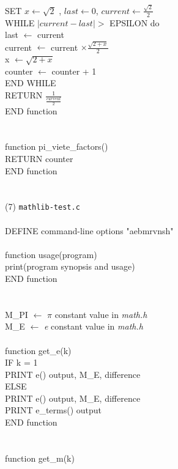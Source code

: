 \documentclass[12pt]{article}
\begin{document}
\indent SET $x \leftarrow \sqrt{2}$ , $last \leftarrow 0$, $current \leftarrow \frac{\sqrt{2}}{2}$ \\
\indent WHILE $| current - last | >$ EPSILON do \\
\indent \indent last $\leftarrow$ current \\
\indent \indent current $\leftarrow$ current $\times \frac{\sqrt{2 + x}}{2}$ \\
\indent \indent x $\leftarrow \sqrt{2 + x}$ \\
\indent \indent counter $\leftarrow$ counter + 1 \\
\indent END WHILE \\
\indent RETURN $\frac{1}{\frac{current}{2}}$ \\
END function \\
\\
\\
function pi\_viete\_factors() \\
\indent RETURN counter \\
END function \\
\\
\\
(7) \texttt{mathlib-test.c} \\
\\
DEFINE command-line options "aebmrvnsh" \\
\\
function usage(program) \\
\indent print(program synopsis and usage) \\
END function \\
\\
\\
M\_PI $\leftarrow$ $\pi$ constant value in \textit{math.h} \\
M\_E $\leftarrow$ \textit{e} constant value in \textit{math.h} \\
\\
function get\_e(k) \\
\indent IF k = 1 \\
\indent \indent PRINT e() output, M\_E, difference \\
\indent ELSE \\
\indent \indent PRINT e() output, M\_E, difference \\
\indent \indent PRINT e\_terms() output \\
END function \\
\\
\\
function get\_m(k) \\
\end{document}
